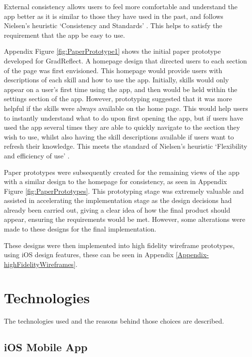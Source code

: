 \documentclass{l4proj}
\begin{document}
External consistency allows users to feel more comfortable and understand the app better as it is similar to those they have used in the past, and follows Nielsen’s heuristic ‘Consistency and Standards’ \citep{schlatter_visual_2013, Nielsen10}. This helps to satisfy the requirement that the app be easy to use. 

Appendix Figure \ref{fig:PaperPrototype1} shows the initial paper prototype developed for GradReflect. A homepage design that directed users to each section of the page was first envisioned. This homepage would provide users with descriptions of each skill and how to use the app. Initially, skills would only appear on a user’s first time using the app, and then would be held within the settings section of the app. However, prototyping suggested that it was more helpful if the skills were always available on the home page. This would help users to instantly understand what to do upon first opening the app, but if users have used the app several times they are able to quickly navigate to the section they wish to use, whilst also having the skill descriptions available if users want to refresh their knowledge. This meets the standard of Nielsen’s heuristic ‘Flexibility and efficiency of use’ \citep{Nielsen10}.

Paper prototypes were subsequently created for the remaining views of the app with a similar design to the homepage for consistency, as seen in Appendix Figure \ref{fig:PaperPrototypes}. This prototyping stage was extremely valuable and assisted in accelerating the implementation stage as the design decisions had already been carried out, giving a clear idea of how the final product should appear, ensuring the requirements would be met. However, some alterations were made to these designs for the final implementation. 

These designs were then implemented into high fidelity wireframe prototypes, using iOS design features, these can be seen in Appendix \ref{Appendix-highFidelityWireframes}.


\section{Technologies}

The technologies used and the reasons behind those choices are described.

\subsection{iOS Mobile App}
\end{document}
